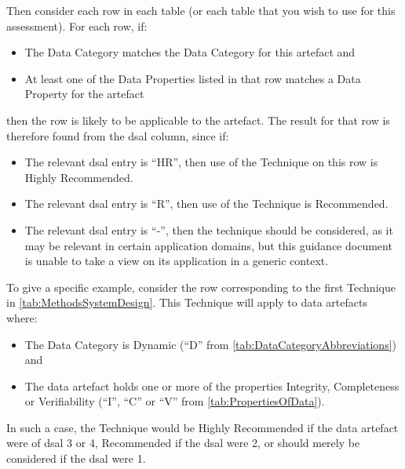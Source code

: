 Then consider each row in each table (or each table that you wish to use for this assessment). For each row, if:
\begin{itemize}
    \item The Data Category matches the Data Category for this artefact and
    \item At least one of the Data Properties listed in that row matches a Data Property for the artefact 
\end{itemize}
then the row is likely to be applicable to the artefact. The result for that row is therefore found from the \gls{dsal} column, since if:
\begin{itemize}
    \item The relevant \gls{dsal} entry is ``HR'', then use of the Technique on this row is Highly Recommended.
    \item The relevant \gls{dsal} entry is ``R'', then use of the Technique is Recommended.
    \item The relevant \gls{dsal} entry is ``-'', then the technique should be considered, as it may be relevant in certain application domains, but this guidance document is unable to take a view on its application in a generic context.
\end{itemize}

To give a specific example, consider the row corresponding to the first Technique in \autoref{tab:MethodsSystemDesign}. This Technique will apply to data artefacts where:
\begin{itemize}
    \item The Data Category is Dynamic (``D'' from \autoref{tab:DataCategoryAbbreviations}) and
    \item The data artefact holds one or more of the properties Integrity, Completeness or Verifiability (``I'', ``C'' or ``V'' from \autoref{tab:PropertiesOfData}).
\end{itemize}
In such a case, the Technique would be Highly Recommended if the data artefact were of \gls{dsal} 3 or 4, Recommended if the \gls{dsal} were 2, or should merely be considered if the \gls{dsal} were 1.

